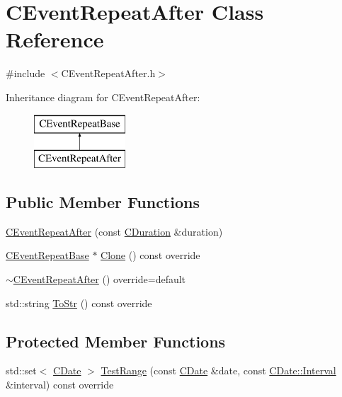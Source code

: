 \hypertarget{class_c_event_repeat_after}{}\section{C\+Event\+Repeat\+After Class Reference}
\label{class_c_event_repeat_after}


{\ttfamily \#include $<$C\+Event\+Repeat\+After.\+h$>$}

Inheritance diagram for C\+Event\+Repeat\+After\+:\begin{figure}[H]
\begin{center}
\leavevmode
\includegraphics[height=2.000000cm]{class_c_event_repeat_after}
\end{center}
\end{figure}
\subsection*{Public Member Functions}
\begin{DoxyCompactItemize}
\item 
\mbox{\hyperlink{class_c_event_repeat_after_a6afc894472d7147d7dd57c27d9a5f12e}{C\+Event\+Repeat\+After}} (const \mbox{\hyperlink{class_c_duration}{C\+Duration}} \&duration)
\item 
\mbox{\hyperlink{class_c_event_repeat_base}{C\+Event\+Repeat\+Base}} $\ast$ \mbox{\hyperlink{class_c_event_repeat_after_ae635e551a44aeda7b155b7e5243a9872}{Clone}} () const override
\item 
\mbox{\hyperlink{class_c_event_repeat_after_a53a1a69bbeecb081673bfc4127bb8c01}{$\sim$\+C\+Event\+Repeat\+After}} () override=default
\item 
std\+::string \mbox{\hyperlink{class_c_event_repeat_after_a367f534544d07fde2ded54374152b9c3}{To\+Str}} () const override
\end{DoxyCompactItemize}
\subsection*{Protected Member Functions}
\begin{DoxyCompactItemize}
\item 
std\+::set$<$ \mbox{\hyperlink{class_c_date}{C\+Date}} $>$ \mbox{\hyperlink{class_c_event_repeat_after_ad4a4b0da551d754d657a10723b39d13c}{Test\+Range}} (const \mbox{\hyperlink{class_c_date}{C\+Date}} \&date, const \mbox{\hyperlink{class_c_date_af23472c977b14ed341b48183ec19d874}{C\+Date\+::\+Interval}} \&interval) const override
\end{DoxyCompactItemize}
